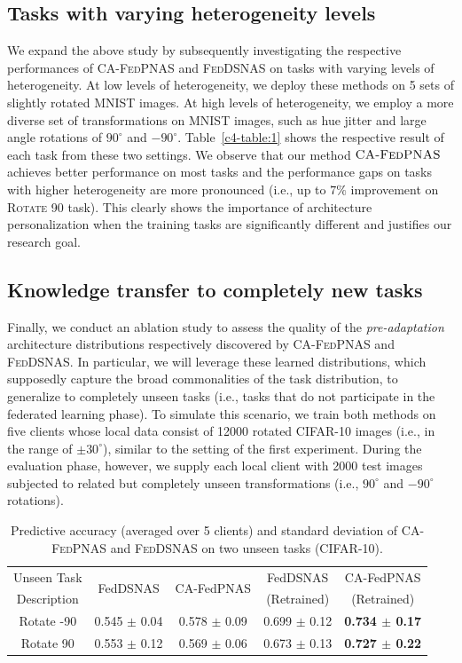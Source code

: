 \subsection{Tasks with varying heterogeneity levels}
We expand the above study by subsequently investigating the respective performances of \textsc{CA-FedPNAS} and \textsc{FedDSNAS} on tasks with varying levels of heterogeneity. At low levels of heterogeneity, we deploy these methods on 5 sets of slightly rotated MNIST images. At high levels of heterogeneity, we employ a more diverse set of transformations on MNIST images, such as hue jitter and large angle rotations of $90^{\circ}$ and $-90^{\circ}$. Table~\ref{c4-table:1} shows the respective result of each task from these two settings. We observe that our method $\textsc{CA-FedPNAS}$ achieves better performance on most tasks and the performance gaps on tasks with higher heterogeneity are more pronounced (i.e., up to $7\%$ improvement on \textsc{Rotate 90} task). This clearly shows the importance of architecture personalization when the training tasks are significantly different and justifies our research goal.

\subsection{Knowledge transfer to completely new tasks} 
Finally, we conduct an ablation study to assess the quality of the \emph{pre-adaptation} architecture distributions respectively discovered by \textsc{CA-FedPNAS} and  \textsc{FedDSNAS}. In particular, we will leverage these learned distributions, which supposedly capture the broad commonalities of the task distribution, to generalize to completely unseen tasks (i.e., tasks that do not participate in the federated learning phase). To simulate this scenario, we train both methods on five clients whose local data consist of 12000 rotated CIFAR-10 images (i.e., in the range of $\pm 30^{\circ}$), similar to the setting of the first experiment. During the evaluation phase, however, we supply each local client with 2000 test images subjected to related but completely unseen transformations (i.e., $90^{\circ}$ and $-90^{\circ}$ rotations). 

\begin{table}[h]
	\centering
	\begin{sc}
		\begin{tabular}{|c|c|c|c|c|}
		\hline
		Unseen Task &  \multirow{2}{*}{FedDSNAS} & \multirow{2}{*}{CA-FedPNAS} & FedDSNAS & CA-FedPNAS \\
		Description & & & (Retrained) & (Retrained) \\
		\hline
		Rotate -90 & 0.545 $\pm$ 0.04 & 0.578 $\pm$ 0.09 & 0.699 $\pm$ 0.12 & \textbf{0.734 $\pm$ 0.17} \\
		\hline
		Rotate 90 & 0.553 $\pm$ 0.12 & 0.569 $\pm$ 0.06 & 0.673 $\pm$ 0.13 & \textbf{0.727 $\pm$ 0.22} \\
		\hline
		\end{tabular}
	\end{sc}
	\caption{Predictive accuracy (averaged over 5 clients) and standard deviation of \textsc{CA-FedPNAS} and \textsc{FedDSNAS} on two unseen tasks (CIFAR-10).}
	\label{c4-table:2}
\end{table}


